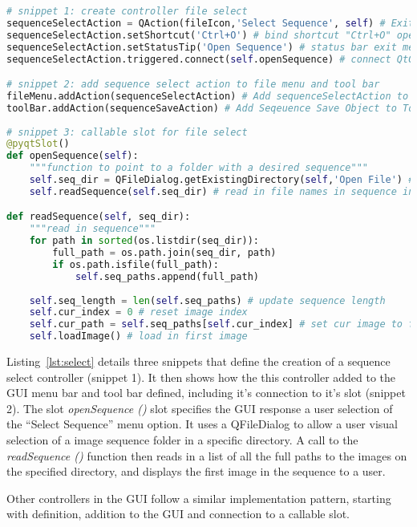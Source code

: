 \begin{lstlisting}[language=Python, caption={Code listing detailing sequence selection controller and connection to slot}, captionpos=b, label={lst:select}]
# snippet 1: create controller file select 
sequenceSelectAction = QAction(fileIcon,'Select Sequence', self) # Exit Action Object
sequenceSelectAction.setShortcut('Ctrl+O') # bind shortcut "Ctrl+O" open file
sequenceSelectAction.setStatusTip('Open Sequence') # status bar exit message
sequenceSelectAction.triggered.connect(self.openSequence) # connect QtGui quit() method 

# snippet 2: add sequence select action to file menu and tool bar
fileMenu.addAction(sequenceSelectAction) # Add sequenceSelectAction to fileMenu 
toolBar.addAction(sequenceSaveAction) # Add Seqeuence Save Object to Tool Bar
    
# snippet 3: callable slot for file select
@pyqtSlot()
def openSequence(self):
    """function to point to a folder with a desired sequence"""
    self.seq_dir = QFileDialog.getExistingDirectory(self,'Open File') # store path to sequence
    self.readSequence(self.seq_dir) # read in file names in sequence into self.paths

def readSequence(self, seq_dir):
    """read in sequence"""
    for path in sorted(os.listdir(seq_dir)):
        full_path = os.path.join(seq_dir, path)
        if os.path.isfile(full_path):
            self.seq_paths.append(full_path)
    
    self.seq_length = len(self.seq_paths) # update sequence length
    self.cur_index = 0 # reset image index
    self.cur_path = self.seq_paths[self.cur_index] # set cur image to first image in self.seq_paths
    self.loadImage() # load in first image
\end{lstlisting}

Listing~\ref{lst:select} details three snippets that define the creation of a
sequence select controller (snippet 1). It then shows how the this controller
added to the GUI menu bar and tool bar
defined, including it's connection to it's slot (snippet 2). The slot
\textit{openSequence ()} slot 
specifies the GUI response a user selection of the ``Select Sequence'' menu
option. It uses a QFileDialog to allow a user visual selection of a image
sequence folder in a specific directory. A call to the \textit{readSequence ()}
function then reads in a list of all the full paths to the images on the
specified directory, and displays the first image in the sequence to a user.

Other controllers in the GUI follow a similar implementation pattern, starting
with definition, addition to the GUI and connection to a callable slot.

